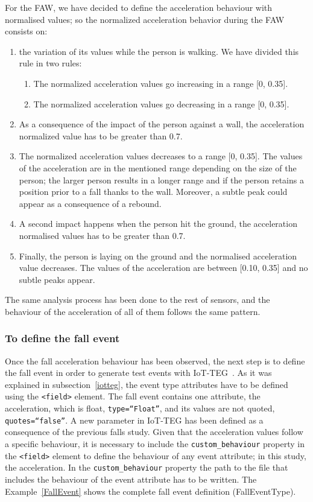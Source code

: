 \documentclass[review]{elsarticle}
\begin{document}
For the FAW, we have decided to define the acceleration behaviour with normalised values; so the 
normalized acceleration behavior during the FAW consists on:
\begin{enumerate}
	\item the variation of its values while the person is walking. We have divided this rule in two rules:
	\begin{enumerate}
		\item The normalized acceleration values go increasing in a range [0, 0.35].
		\item The normalized acceleration values go decreasing in a range [0, 0.35].
	\end{enumerate}
	\item As a consequence of the impact of the person against a wall, the acceleration normalized value 
	has to be greater than 0.7.
	\item The normalized acceleration values decreases to a range [0, 0.35]. The values of the acceleration are 
	in the mentioned range depending on the size of the person; the larger person results in a longer range 
	and if the person retains a position prior to a fall thanks to the wall. Moreover, a subtle peak could 
	appear as a consequence of a rebound.
	\item A second impact happens when the person hit the ground, the acceleration normalised values has to 
	be greater than 0.7.
	\item Finally, the person is laying on the ground and the normalised acceleration value decreases. The 
	values of the acceleration are between [0.10, 0.35] and no subtle peaks appear. 
\end{enumerate}

The same analysis process has been done to the rest of sensors, and the behaviour of the acceleration of all of 
them follows the same pattern.

\subsubsection*{To define the fall event} Once the fall acceleration behaviour has been observed, the next step is to define the 
fall event in order to generate test events with IoT-TEG~\cite{TesisGutierrez2017,Gutierrez2017}. As it was explained in 
subsection~\ref{iotteg}, the event type attributes have
to be defined using the \texttt{<field>} element. The fall event contains one attribute, the acceleration, which is float, 
\texttt{type=``Float''}, and its values are not quoted, \texttt{quotes=``false''}. A new parameter in IoT-TEG has been defined as a 
consequence of the previous falls study. Given that the acceleration values follow a specific behaviour, it is necessary to include 
the \texttt{custom\_behaviour} property in the \texttt{<field>} element to define the behaviour of any event attribute; 
in this study, the acceleration. In the \texttt{custom\_behaviour} property the path to the file that includes the behaviour of the 
event attribute has to be written. The Example~\ref{FallEvent} shows the complete fall event definition (FallEventType).
\end{document}
